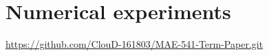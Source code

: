 \section{Numerical experiments} \label{sec:numerical_experiments}

\begin{center}
    \small
    \url{https://github.com/ClouD-161803/MAE-541-Term-Paper.git}
\end{center}